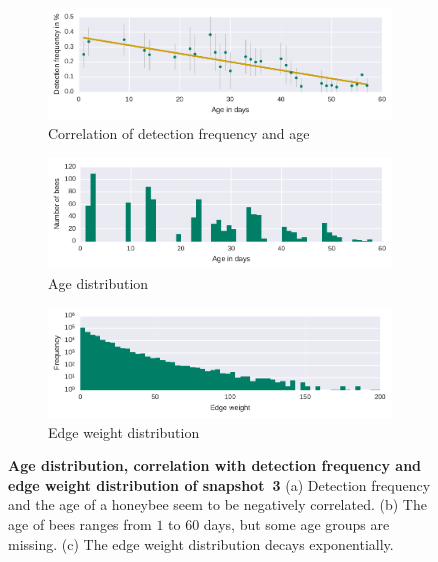 \begin{figure}[bp]
	\centering
	\begin{subfigure}[b]{1\textwidth}
	\centering
	\includegraphics[width=1.0\textwidth]{Figures/n3_detFvsAge}
	\caption[Correlation]{Correlation of detection frequency and age}
	\label{fig:n3detfVSage}
	\end{subfigure} 
	\begin{subfigure}[b]{1\textwidth}
	\centering
	\includegraphics[width=1.0\textwidth]{Figures/n3_ages.pdf}
	\caption[Age distribution]{Age distribution}
	\label{fig:n3ageDist}
	\end{subfigure}
	\begin{subfigure}[b]{1\textwidth}
	\centering
	\includegraphics[width=1.0\textwidth]{Figures/n3-edgeWeightDist.pdf}
	\caption[Edge weight distribution]{Edge weight distribution}
	\label{fig:edgeWdist}
	\end{subfigure}
	\caption[Age distribution, correlation with detection frequency and edge weight distribution of snapshot~3]{\textbf{Age distribution, correlation with detection frequency and edge weight distribution of snapshot~3} (a) Detection frequency and the age of a honeybee seem to be negatively correlated. (b) The age of bees ranges from $1$ to $60$ days, but some age groups are missing. (c) The edge weight distribution decays exponentially.}
	\label{fig:ageDetF}
\end{figure}